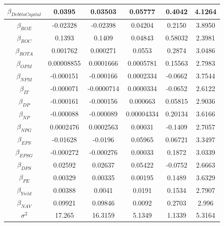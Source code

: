 \documentclass[times, doublespace]{auth}
\begin{document}
\begin{table}
\begin{tabular}{|c|c|c|c|c|c|}
		\hline
		$\beta_{Debt to Capital}$ & 0.0395 & 0.03503 & 0.05777 & 0.4042 & 4.1264\\
		\hline
		$\beta_{ROE}$ & -0.02328 & -0.02398 & 0.04204 & 0.2150 & 3.8950\\
		\hline
		$\beta_{ROC}$ & 0.1393 & 0.1409 & 0.04843 & 0.58032 & 2.3981\\
		\hline
		$\beta_{ROTA}$ & 0.001762 & 0.000271 & 0.0553 & 0.2874 & 3.0486\\
		\hline
		$\beta_{OPM}$ & 0.00008855 & 0.0001666 & 0.0005781 & 0.15563 & 2.7983\\
		\hline
		$\beta_{NPM}$ & -0.000151 & -0.000166 & 0.0002334 & -0.0662 & 3.7544\\
		\hline
		$\beta_{IT}$ & -0.000071 & -0.0000714 & 0.0000334 & -0.0652 & 2.6122\\
		\hline
		$\beta_{DP}$ & -0.000161 & -0.000156 & 0.000663 & 0.05815 & 2.9036\\
		\hline
		$\beta_{NP}$ & -0.000088 & -0.000089 & 0.00004334 & 0.20134 & 3.6166\\
		\hline
		$\beta_{NPG}$ & 0.0002476 & 0.0002563 & 0.00031 & -0.1409 & 2.7057\\
		\hline
		$\beta_{EPS}$ & -0.01628 & -0.0196 & 0.05965 & 0.06721 & 3.3497\\
		\hline
		$\beta_{EPSG}$ & -0.000272 & -0.000276 & 0.00033 & 0.1872 & 3.0339\\
		\hline
		$\beta_{DPS}$ & 0.02592 & 0.02637 & 0.05422 & -0.0752 & 2.6663\\
		\hline
		$\beta_{PE}$ & 0.00329 & 0.00335 & 0.00195 & 0.1489 & 3.6329\\
		\hline
		$\beta_{Yield}$ & 0.00388 & 0.0041 & 0.0191 & 0.1534 & 2.7907\\
		\hline
		$\beta_{NAV}$ & 0.09921 & 0.09846 & 0.0092 & 0.2703 & 2.996\\
		\hline
		$\sigma^{2}$ & 17.265 & 16.3159 & 5.1349 & 1.1339 & 5.3164\\
		\hline
	\end{tabular}
\end{table}
\end{document}
